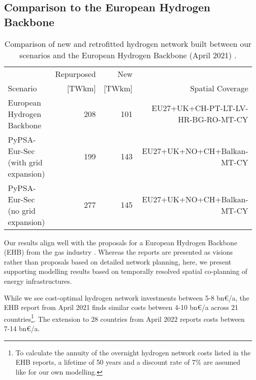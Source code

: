 \subsection*{Comparison to the European Hydrogen Backbone}

\begin{table}
  \caption{Comparison of new and retrofitted hydrogen network built between our scenarios and the European Hydrogen Backbone (April 2021) \cite{gasforclimateExtendingEuropean2021}.}
  \label{tab:ehb}
  \centering
  \footnotesize
  \begin{tabular}{lrrr}
      \toprule
       & Repurposed & New &  \\
       Scenario& [TWkm] & [TWkm] & Spatial Coverage \\
      \midrule
      European Hydrogen Backbone \cite{gasforclimateExtendingEuropean2021} & 208 & 101 & EU27+UK+CH-PT-LT-LV-HR-BG-RO-MT-CY\\
      PyPSA-Eur-Sec (with grid expansion) & 199 & 143 & EU27+UK+NO+CH+Balkan-MT-CY \\
      PyPSA-Eur-Sec (no grid expansion) & 277 & 145 & EU27+UK+NO+CH+Balkan-MT-CY \\
      \bottomrule
    \end{tabular}
\end{table}


Our results align well with the proposals for a European Hydrogen Backbone (EHB)
from the gas industry
\cite{gasforclimateEuropeanHydrogen2020,gasforclimateExtendingEuropean2021,gasforclimateEuropeanHydrogen2021,gasforclimateEuropeanHydrogen2022}.
Whereas the reports are presented as visions rather than proposals based on
detailed network planning, here, we present supporting modelling results based on
temporally resolved spatial co-planning of energy infrastructures.

While we see cost-optimal hydrogen network investments between 5-8 bn\euro/a,
the EHB report from April 2021 \cite{gasforclimateExtendingEuropean2021} finds
similar costs between 4-10 bn\euro/a across 21
countries\footnote{To calculate the annuity of the overnight hydrogen
network costs listed in the EHB reports, a lifetime of 50 years and a discount
rate of 7\% are assumed like for our own modelling.}. The extension to 28
countries from April 2022 \cite{gasforclimateEuropeanHydrogen2022} reports costs
between 7-14 bn\euro/a.

